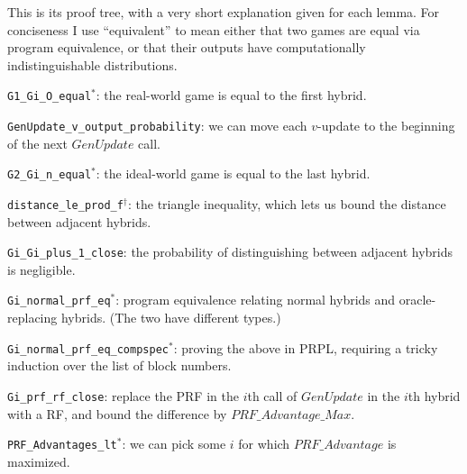 \documentclass[12pt,lot, lof]{puthesis}
\newcommand{\li} {\lstinline}
\begin{document}
{This is its proof tree, with a very short explanation given for each lemma. For conciseness I use ``equivalent'' to mean either that two games are equal via program equivalence, or that their outputs have computationally indistinguishable distributions. 

\begin{longenum}
\item \li|G1_Gi_O_equal|$^*$: the real-world game is equal to the first hybrid.
\item \li|GenUpdate_v_output_probability|: we can move each $v$-update to the beginning of the next $GenUpdate$ call.
\item \li|G2_Gi_n_equal|$^*$: the ideal-world game is equal to the last hybrid.
\item \li|distance_le_prod_f|$^\dag$: the triangle inequality, which lets us bound the distance between adjacent hybrids.
\item \li|Gi_Gi_plus_1_close|: the probability of distinguishing between adjacent hybrids is negligible.
  \begin{longenum}
  \item \li|Gi_normal_prf_eq|$^*$: program equivalence relating normal hybrids and oracle-replacing hybrids. (The two have different types.)
    \begin{longenum}
    \item \li|Gi_normal_prf_eq_compspec|$^*$: proving the above in PRPL, requiring a tricky induction over the list of block numbers.
    \end{longenum}
  \item \li|Gi_prf_rf_close|: replace the PRF in the $i$th call of $GenUpdate$ in the $i$th hybrid with a RF, and bound the difference by $PRF\_Advantage\_Max$.
    \begin{longenum}
      \item \li|PRF_Advantages_lt|$^*$: we can pick some $i$ for which $PRF\_Advantage$ is maximized.
    \end{longenum}


\end{longenum}
\end{longenum}}
\end{document}
